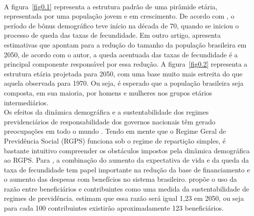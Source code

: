 \documentclass[12pt, 						%
			openright, 					%
			twoside,					%
			a4paper,x					%
			english,					%
			brazil]{abntex2}				%
\begin{document}
\begin{figure}[!htb]
\begin{subfigure}[b]{0.5\textwidth}
\begin{center}
		\end{center}
 		\end{subfigure}
	\end{figure} \\
	A figura~\ref{fig0.1} representa a estrutura padrão de uma pirâmide etária, representada por uma população jovem e em crescimento. De acordo com , o período de bônus demográfico teve início na década de 70, quando se iniciou o processo de queda das taxas de fecundidade. Em outro artigo,  apresenta estimativas que apontam para a redução do tamanho da população brasileira em 2050, de acordo com o autor, a queda acentuada das taxas de fecundidade é a  principal componente responsável por essa redução. A figura~\ref{fig0.2} representa a estrutura etária projetada para 2050, com uma base muito mais estreita do que aquela observada para 1970. Ou seja, é esperado que a população brasileira seja composta, em sua maioria, por homens e mulheres nos grupos etários intermediários.\\
	Os efeitos da dinâmica demográfica e a sustentabilidade dos regimes previdenciários de responsabilidade dos governos nacionais têm gerado preocupações em todo o mundo \cite{de2013aging, bloom2007demographic}. Tendo em mente que o Regime Geral de Previdência Social (RGPS) funciona sob o regime de repartição simples, é bastante intuitivo compreender os obstáculos impostos pela dinâmica demográfica ao RGPS. Para , a combinação do aumento da expectativa de vida e da queda da taxa de fecundidade tem papel importante na redução da base de financiamento e o aumento das despesas com benefícios no sistema brasileiro.  propõe o uso da razão entre beneficiários e contribuintes como uma medida da sustentabilidade de regimes de previdência.  estimam que essa razão será igual 1,23 em 2050, ou seja para cada 100 contribuintes existirão aproximadamente 123 beneficiários. 
\end{document}
